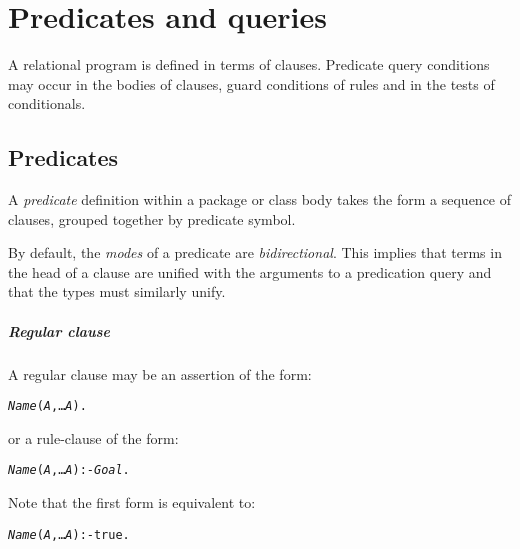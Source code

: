\chapter{Predicates and queries}
\label{goals}

A relational program is defined in terms of clauses. Predicate query conditions may occur in the bodies of clauses, guard conditions of rules and in the tests of conditionals.

\section{Predicates}
\label{theta:predicate}

A \emph{predicate} definition within a package or class body takes the form a sequence of clauses, grouped together by predicate symbol. 

By default, the \emph{modes} of a predicate are \emph{bidirectional}. This implies that terms in the head of a clause are unified with the arguments to a predication query and that the types must similarly unify.

\paragraph{Regular clause}
A regular clause may be an assertion of the form: 
\begin{alltt}
\emph{Name}(\emph{A},\ldots\emph{A\subn}).
\end{alltt}
or a rule-clause of the form:
\begin{alltt}
\emph{Name}(\emph{A},\ldots\emph{A\subn}):-\emph{Goal}.
\end{alltt}

Note that the first form is equivalent to:
\begin{alltt}
\emph{Name}(\emph{A},\ldots\emph{A\subn}):-true.
\end{alltt}

